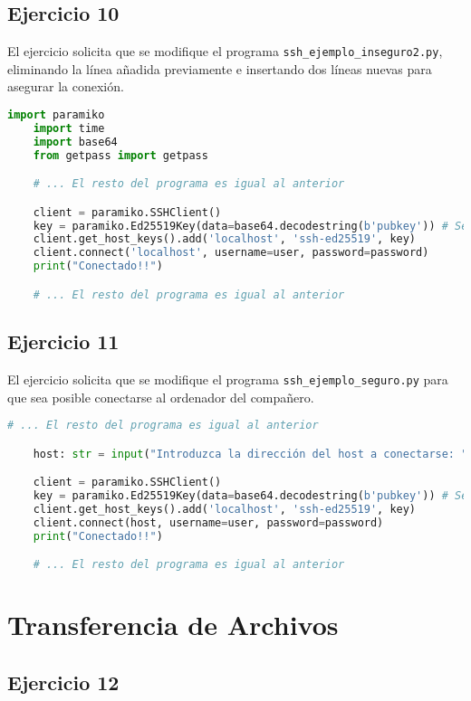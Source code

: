 \subsection{Ejercicio 10}

El ejercicio solicita que se modifique el programa \lstinline{ssh_ejemplo_inseguro2.py},
eliminando la línea añadida previamente e insertando dos líneas nuevas para asegurar la conexión.

\begin{lstlisting}[language=Python]
    import paramiko
    import time
    import base64
    from getpass import getpass

    # ... El resto del programa es igual al anterior

    client = paramiko.SSHClient()
    key = paramiko.Ed25519Key(data=base64.decodestring(b'pubkey')) # See /etc/ssh/
    client.get_host_keys().add('localhost', 'ssh-ed25519', key)
    client.connect('localhost', username=user, password=password)
    print("Conectado!!")

    # ... El resto del programa es igual al anterior
\end{lstlisting}

\subsection{Ejercicio 11}

El ejercicio solicita que se modifique el programa \lstinline{ssh_ejemplo_seguro.py}
para que sea posible conectarse al ordenador del compañero.

\begin{lstlisting}[language=Python]
    # ... El resto del programa es igual al anterior

    host: str = input("Introduzca la dirección del host a conectarse: ")

    client = paramiko.SSHClient()
    key = paramiko.Ed25519Key(data=base64.decodestring(b'pubkey')) # See /etc/ssh/
    client.get_host_keys().add('localhost', 'ssh-ed25519', key)
    client.connect(host, username=user, password=password)
    print("Conectado!!")

    # ... El resto del programa es igual al anterior
\end{lstlisting}

\section{Transferencia de Archivos}
\subsection{Ejercicio 12}
